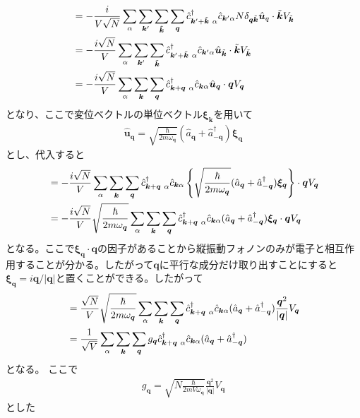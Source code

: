 \documentclass[dvipdfmx, 11pt, a4paper]{jsarticle}
\theoremstyle{definition}
\numberwithin{equation}{section}
\begin{document}
\begin{derivationBox}
\begin{align}
            &= -\frac{i}{V\sqrt{N}}\sum_\alpha  \sum_{\bm{k}'}\sum_{\tilde{\bm{k}}} \sum_{\bm{q}}\hat{c}^\dagger_{\bm{k}'+\tilde{\bm{k}}\ \alpha}   \hat{c}_{\bm{k}'\alpha}   N\delta_{\bm{q} \tilde{\bm{k}}}\hat{\bm{u}}_q \cdot \tilde{\bm{k}} V_{\tilde{\bm{k}}} \notag \\
            &= -\frac{i\sqrt{N}}{V}\sum_\alpha  \sum_{\bm{k}'}\sum_{\tilde{\bm{k}}} \hat{c}^\dagger_{\bm{k}'+\tilde{\bm{k}}\ \alpha}   \hat{c}_{\bm{k}'\alpha}   \hat{\bm{u}}_{\tilde{\bm{k}}} \cdot \tilde{\bm{k}} V_{\tilde{\bm{k}}}  \notag \\
            &= -\frac{i\sqrt{N}}{V}\sum_\alpha  \sum_{\bm{k}}\sum_{\bm{q}} \hat{c}^\dagger_{\bm{k}+\bm{q}\ \alpha}   \hat{c}_{\bm{k}\alpha}   \hat{\bm{u}}_{\bm{q}} \cdot \bm{q} V_{\bm{q}}  
        \end{align}
        となり、ここで変位ベクトルの単位ベクトル$\bm{\xi}_{\bm{k}}$を用いて
        \begin{align}
            \hat{\bm{u}}_{\bm{q}} = \sqrt{\frac{\hbar}{2m\omega_{\bm{q}}}}(\hat{a}_{\bm{q}} + \hat{a}^\dagger_{-\bm{q}}) \bm{\xi}_{\bm{q}}
        \end{align}
        とし、代入すると
        \begin{align}
            &=  -\frac{i\sqrt{N}}{V}\sum_\alpha  \sum_{\bm{k}}\sum_{\bm{q}} \hat{c}^\dagger_{\bm{k}+\bm{q}\ \alpha}   \hat{c}_{\bm{k}\alpha}   \left\{ \sqrt{\frac{\hbar}{2m\omega_{\bm{q}}}}(\hat{a}_{\bm{q}} + \hat{a}^\dagger_{-\bm{q}}) \bm{\xi}_{\bm{q}}  \right\} \cdot \bm{q} V_{\bm{q}}  \notag \\
            &=  -\frac{i\sqrt{N}}{V}\sqrt{\frac{\hbar}{2m\omega_{\bm{q}}}}\sum_\alpha  \sum_{\bm{k}}\sum_{\bm{q}} \hat{c}^\dagger_{\bm{k}+\bm{q}\ \alpha}   \hat{c}_{\bm{k}\alpha}    (\hat{a}_{\bm{q}} + \hat{a}^\dagger_{-\bm{q}}) \bm{\xi}_{\bm{q}}   \cdot \bm{q} V_{\bm{q}}  
        \end{align}
        となる。ここで$\bm{\xi}_{\bm{q}}   \cdot \bm{q}$の因子があることから縦振動フォノンのみが電子と相互作用することが分かる。したがって$\bm{q}$に平行な成分だけ取り出すことにすると$\bm{\xi}_{\bm{q}} = i\bm{q}/|\bm{q}|$と置くことができる。したがって
        \begin{align}
            &=  \frac{\sqrt{N}}{V}\sqrt{\frac{\hbar}{2m\omega_{\bm{q}}}}\sum_\alpha  \sum_{\bm{k}}\sum_{\bm{q}} \hat{c}^\dagger_{\bm{k}+\bm{q}\ \alpha}   \hat{c}_{\bm{k}\alpha}    (\hat{a}_{\bm{q}} + \hat{a}^\dagger_{-\bm{q}}) \frac{\bm{q}^2}{|\bm{q}|} V_{\bm{q}}   \notag \\
            &=  \frac{1}{\sqrt{V}}\sum_\alpha  \sum_{\bm{k}}\sum_{\bm{q}}  g_{\bm{q}} \hat{c}^\dagger_{\bm{k}+\bm{q}\ \alpha}  \hat{c}_{\bm{k}\alpha}    (\hat{a}_{\bm{q}} + \hat{a}^\dagger_{-\bm{q}}) 
        \end{align}
        となる。
        ここで
        \begin{align}
            g_{\bm{q}} = \sqrt{N\frac{\hbar}{2mV\omega_{\bm{q}}}}\frac{\bm{q}^2}{|\bm{q}|} V_{\bm{q}}  
        \end{align}
        とした
    \end{derivationBox}
\end{document}
